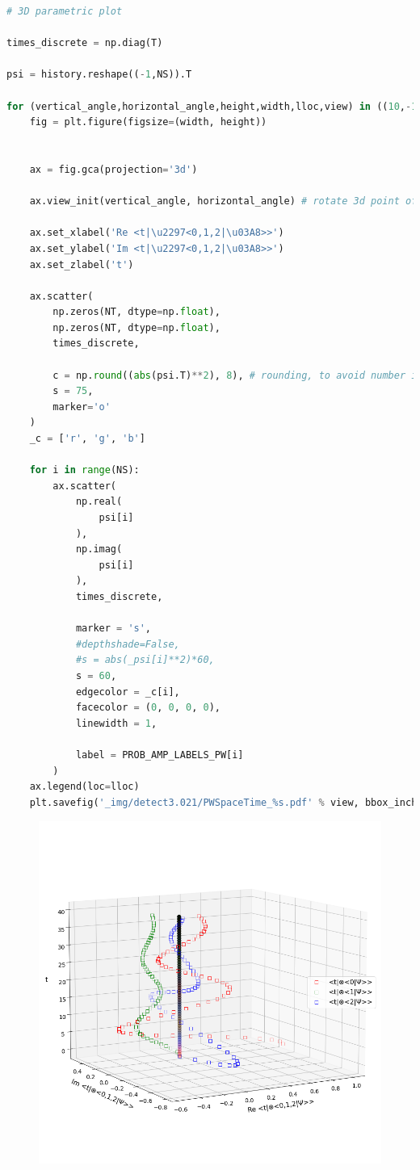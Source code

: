 \begin{lstlisting}[language=Python]
# 3D parametric plot

times_discrete = np.diag(T)

psi = history.reshape((-1,NS)).T

for (vertical_angle,horizontal_angle,height,width,lloc,view) in ((10,-120,15,25,'center right','side'), (80,-100,15,25,'center right','top')):
    fig = plt.figure(figsize=(width, height))


    ax = fig.gca(projection='3d')

    ax.view_init(vertical_angle, horizontal_angle) # rotate 3d point of view

    ax.set_xlabel('Re <t|\u2297<0,1,2|\u03A8>>')
    ax.set_ylabel('Im <t|\u2297<0,1,2|\u03A8>>')
    ax.set_zlabel('t')

    ax.scatter(
        np.zeros(NT, dtype=np.float),
        np.zeros(NT, dtype=np.float),
        times_discrete,

        c = np.round((abs(psi.T)**2), 8), # rounding, to avoid number instability causing out-of-range rgb vals
        s = 75,
        marker='o'
    )
    _c = ['r', 'g', 'b']

    for i in range(NS):
        ax.scatter(
            np.real(
                psi[i]
            ),
            np.imag(
                psi[i]
            ),
            times_discrete,

            marker = 's',
            #depthshade=False,
            #s = abs(_psi[i]**2)*60,
            s = 60,
            edgecolor = _c[i],
            facecolor = (0, 0, 0, 0),
            linewidth = 1,

            label = PROB_AMP_LABELS_PW[i]
        )
    ax.legend(loc=lloc)
    plt.savefig('_img/detect3.021/PWSpaceTime_%s.pdf' % view, bbox_inches='tight', pad_inches=0)
\end{lstlisting}

\begin{figure}[h!]
\centering
\includegraphics[width=0.66\linewidth]{tex/appendix/nb/jupyter/3lev/output_64_0.png}

\end{figure}

